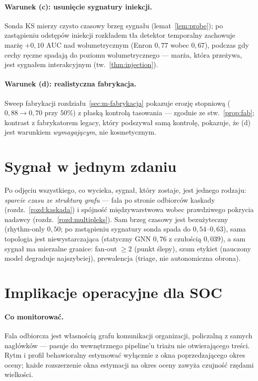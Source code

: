 \paragraph{Warunek (c): usunięcie sygnatury iniekcji.} Sonda KS
mierzy czysto czasowy brzeg sygnału (lemat~\ref{lem:probe}); po
zastąpieniu odstępów iniekcji rozkładem tła detektor temporalny
zachowuje marżę $+0{,}10$ AUC nad wolumetrycznym (Enron
$0{,}77$ wobec $0{,}67$), podczas gdy cechy ręczne spadają do
poziomu wolumetrycznego --- marża, która przeżywa, jest sygnałem
interakcyjnym (tw.~\ref{thm:injection}).

\paragraph{Warunek (d): realistyczna fabrykacja.} Sweep fabrykacji
rozdziału~\ref{sec:m-fabrykacja} pokazuje erozję stopniową
($0{,}88\to0{,}70$ przy $50\%$) z płaską kontrolą tasowania ---
zgodnie ze stw.~\ref{prop:fab}; kontrast z fabrykatorem legacy,
który podszywał samą kontrolę, pokazuje, że (d) jest warunkiem
\emph{wymagającym}, nie kosmetycznym.

\section{Sygnał w jednym zdaniu}
\label{sec:s-sygnal}

Po odjęciu wszystkiego, co wycieka, sygnał, który zostaje,
jest jednego rodzaju: \emph{sparcie czasu ze strukturą grafu}
--- fala po stronie odbiorców kaskady (rozdz.~\ref{rozd:kaskada})
i spójność międzywarstwowa wobec prawdziwego pokrycia nadawcy
(rozdz.~\ref{rozd:multipleks}). Sam brzeg czasowy jest
bezużyteczny (rhythm-only $0{,}50$; po zastąpieniu sygnatury
sonda spada do $0{,}54$--$0{,}63$), sama topologia jest
niewystarczająca (statyczny GNN $0{,}76$ z czułością $0{,}039$),
a sam sygnał ma mierzalne granice: fan-out $\ge2$ (punkt ślepy),
szum etykiet (nauczony model degraduje najszybciej), prewalencja
(triage, nie autonomiczna obrona).

\section{Implikacje operacyjne dla SOC}
\label{sec:s-soc}

\paragraph{Co monitorować.} Fala odbiorcza jest własnością grafu
komunikacji organizacji, policzalną z samych nagłówków --- pasuje do
wewnętrznego pipeline'u triażu nie otwierającego treści. Rytm
i profil behawioralny estymować wyłącznie z okna poprzedzającego
okres oceny; każde rozszerzenie okna estymacji na okres oceny
zawyża czujność rzędami wielkości.

